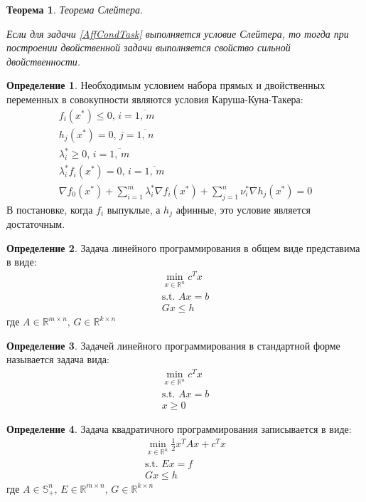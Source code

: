 \documentclass[a4paper,12pt]{article}
\renewcommand{\leq}{\ensuremath{\leqslant}}
\renewcommand{\geq}{\ensuremath{\geqslant}}
\theoremstyle{plain}
\newtheorem{theorem}{Теорема}[section]
\theoremstyle{definition}
\newtheorem{definition}{Определение}[section]
\theoremstyle{remark}
\begin{document}
\begin{theorem} Теорема Слейтера.

	Если для задачи \eqref{AffCondTask} выполняется условие Слейтера, то тогда при построении двойственной задачи выполняется свойство сильной двойственности.
\end{theorem}

\begin{definition}
	Необходимым условием набора прямых и двойственных переменных в совокупности являются условия Каруша-Куна-Такера:
	\begin{align}
		f_i(x^*) \leq 0,\, i = \overline{1,\,m}         \\
		h_j(x^*) = 0,\, j = \overline{1,\,n}            \\
		\lambda_i^* \geq 0,\, i = \overline{1,\,m}      \\
		\lambda_i^*f_i(x^*) = 0,\, i = \overline{1,\,m} \\
		\nabla f_0(x^*) + \sum_{i = 1}^m \lambda_i^* \nabla f_i(x^*) + \sum_{j = 1}^n \nu_i^* \nabla h_j(x^*) = 0
	\end{align}
	В постановке, когда $f_i$ выпуклые, а $h_j$ афинные, это условие является достаточным.
\end{definition}

\begin{definition}
	Задача линейного программирования в общем виде представима в виде:
	\begin{align*}
		\min_{x \in \mathbb{R}^n} c^Tx \\
		\text{s.t. } Ax=b              \\
		Gx \leq h
	\end{align*}
	где $A \in \mathbb{R}^{m \times n},\, G \in \mathbb{R}^{k \times n}$
\end{definition}

\begin{definition}
	Задачей линейного программирования в стандартной форме называется задача вида:
	\begin{align*}
		\min_{x \in \mathbb{R}^n} c^Tx \\
		\text{s.t. }Ax = b             \\
		x \geq 0
	\end{align*}
\end{definition}

\begin{definition}
	Задача квадратичного программирования записывается в виде:
	\begin{align*}
		\min_{x \in \mathbb{R}^n} \frac{1}{2}x^TAx + c^Tx \\
		\text{s.t. } Ex = f                               \\
		Gx \leq h
	\end{align*}
	где $A \in \mathbb{S}^n_+,\, E \in \mathbb{R}^{m \times n},\, G \in \mathbb{R}^{k \times n}$
\end{definition}
\end{document}
